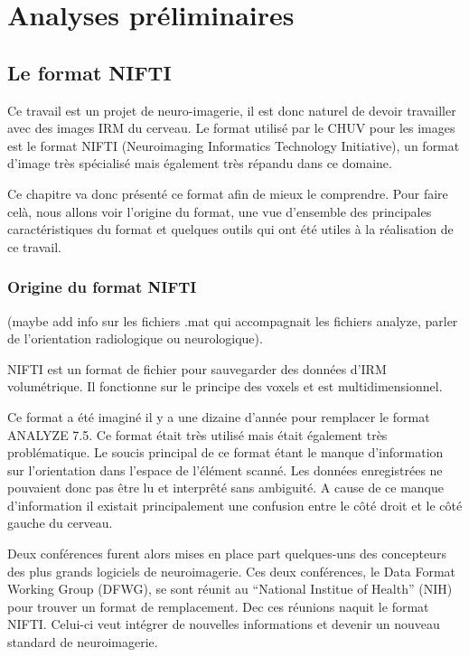 \documentclass[a4paper,10pt,openany,oneside]{sphinxmanual}
\begin{document}
\chapter{Analyses préliminaires}
\label{index:analyses-preliminaires}

\section{Le format NIFTI}
\label{index:le-format-nifti}
Ce travail est un projet de neuro-imagerie, il est donc naturel de devoir travailler avec des
images IRM du cerveau. Le format utilisé par le CHUV pour les images est le format NIFTI
(Neuroimaging Informatics Technology Initiative), un format d'image très spécialisé mais
également très répandu dans ce domaine.

Ce chapitre va donc présenté ce format afin de mieux le comprendre. Pour faire celà, nous
allons voir l'origine du format, une vue d'ensemble des principales caractéristiques du format
et quelques outils qui ont été utiles à la réalisation de ce travail.


\subsection{Origine du format NIFTI}
\label{index:origine-du-format-nifti}
(maybe add info sur les fichiers .mat qui accompagnait les fichiers analyze, parler de l'orientation
radiologique ou neurologique).

NIFTI est un format de fichier pour sauvegarder des données d'IRM volumétrique. Il fonctionne
sur le principe des voxels et est multidimensionnel.

Ce format a été imaginé il y a une dizaine d'année pour remplacer le format ANALYZE 7.5.
Ce format était très utilisé mais était également très problématique. Le soucis principal de
ce format étant le manque d'information sur l'orientation dans l'espace de l'élément scanné.
Les données enregistrées ne pouvaient donc pas être lu et interprêté sans ambiguité. A cause
de ce manque d'information il existait principalement une confusion entre le côté droit et le
côté gauche du cerveau.

Deux conférences furent alors mises en place part quelques-uns des concepteurs des plus grands
logiciels de neuroimagerie. Ces deux conférences, le Data Format Working Group (DFWG), se sont
réunit au ``National Institue of Health'' (NIH) pour trouver un format de remplacement. Dec ces
réunions naquit le format NIFTI. Celui-ci veut intégrer de nouvelles informations et devenir
un nouveau standard de neuroimagerie.
\end{document}

